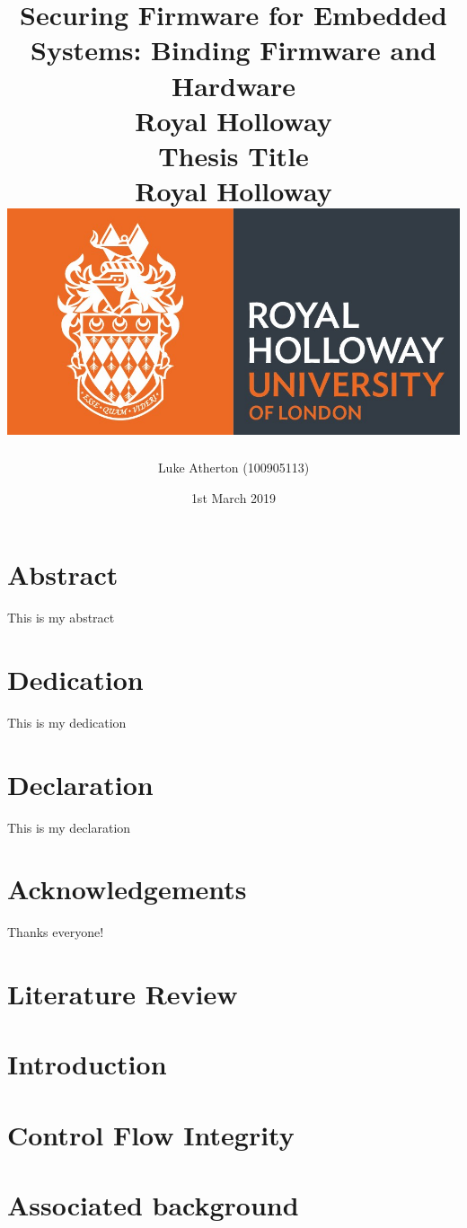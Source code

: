 \documentclass[10pt]{report}
\title{
	{Securing Firmware for Embedded Systems: Binding Firmware and Hardware}\\
	{\large Royal Holloway}\\
}
\title{
	{Thesis Title}\\
	{\large Royal Holloway}\\
	{\includegraphics[scale=0.5]{royalholloway.jpg}}
}
\author{Luke Atherton (100905113)}
\date{1st March 2019}
\newif\iflitreview
\begin{document}
\maketitle

\iflitreview

\else

\chapter*{Abstract}
This is my abstract

\chapter*{Dedication}
This is my dedication

\chapter*{Declaration}
This is my declaration

\chapter*{Acknowledgements}
Thanks everyone!

\fi

\tableofcontents

\iflitreview

\chapter{Literature Review}

\else

\chapter{Introduction}




\chapter{Control Flow Integrity}


\chapter{Associated background}


\end{document}
